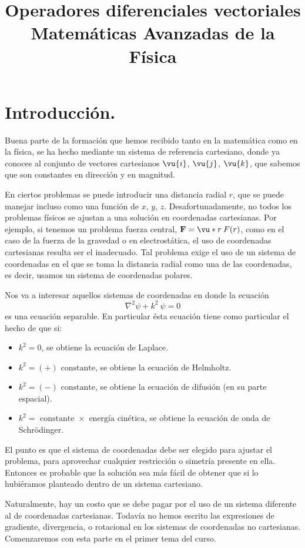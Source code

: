 
\title{Operadores diferenciales vectoriales \\ {\large Matemáticas Avanzadas de la Física}}
\date{ }

\renewcommand\labelenumii{\theenumi.{\arabic{enumii}}}
\maketitle
\fontsize{14}{14}\selectfont
\section{Introducción.}
Buena parte de la formación que hemos recibido tanto en la matemática como en la física, se ha hecho mediante un sistema de referencia cartesiano, donde ya conoces al conjunto de vectores cartesianos $\vu{i}$, $\vu{j}$, $\vu{k}$, que sabemos que son constantes en dirección y en magnitud. 
\par
En ciertos problemas se puede introducir una distancia radial $r$, que se puede manejar incluso como una función de $x$, $y$, $z$. Desafortunadamente, no todos los problemas físicos se ajustan a una solución en coordenadas cartesianas. Por ejemplo, si tenemos un problema fuerza central, $\mathbf{F} = \vu*{r} \: F(r)$, como en el caso de la fuerza de la gravedad o en electrostática, el uso de coordenadas cartesianas resulta ser el inadecuado. Tal problema exige el uso de un sistema de coordenadas en el que se toma la distancia radial como una de las coordenadas, es decir, usamos un sistema de coordenadas polares.
\par
Nos va a interesar aquellos sistemas de coordenadas en donde la ecuación
\[ \nabla^{2} \psi + k^{2} \: \psi =0 \]
es una ecuación separable.  En particular ésta ecuación tiene como particular el hecho de que si:
\begin{itemize}
\item $k^{2} = 0$, se obtiene la ecuación de Laplace.
\item $k^{2} = (+) \mbox{ constante}$, se obtiene la ecuación de Helmholtz.
\item $k^{2} = (-) \mbox{ constante}$, se obtiene la ecuación de difusión (en su parte espacial).
\item $k^{2} = \mbox{ constante } \times \mbox{ energía cinética}$, se obtiene la ecuación de onda de Schrödinger.
\end{itemize}
El punto es que el sistema de coordenadas debe ser elegido para ajustar el problema, para aprovechar cualquier restricción o simetría presente en ella. Entonces es probable que la solución sea más fácil de obtener que si lo hubiéramos planteado dentro de un sistema cartesiano.
\par
Naturalmente, hay un costo que se debe pagar por el uso de un sistema diferente al de coordenadas cartesianas. Todavía no hemos escrito las expresiones de gradiente, divergencia, o rotacional en los sistemas de coordenadas no cartesianas. Comenzaremos con esta parte en el primer tema del curso.
